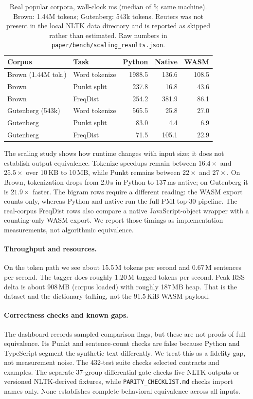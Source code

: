 \documentclass[pdflatex,sn-mathphys-num]{sn-jnl}
\theoremstyle{thmstyleone}
\begin{document}
\begin{table}[!htbp]
\centering
\caption{Real popular corpora, wall-clock ms (median of 5; same machine). Brown: 1.44M tokens; Gutenberg: 543k tokens. Reuters was not present in the local NLTK data directory and is reported as skipped rather than estimated. Raw numbers in \texttt{paper/bench/scaling\_results.json}.}
\label{tab:realcorpora}
\begin{tabular}{@{}l l r r r@{}}
\toprule
Corpus & Task & Python & Native & WASM \\
\midrule
Brown (1.44M tok.) & Word tokenize & 1988.5 & 136.6 & 108.5 \\
Brown              & Punkt split   & 237.8  & 16.8  & 43.6 \\
Brown              & FreqDist      & 254.2  & 381.9 & 86.1 \\
Gutenberg (543k)   & Word tokenize & 565.5  & 25.8  & 27.0 \\
Gutenberg          & Punkt split   & 83.0   & 4.4   & 6.9 \\
Gutenberg          & FreqDist      & 71.5   & 105.1 & 22.9 \\
\bottomrule
\end{tabular}
\end{table}

The scaling study shows how runtime changes with input size; it does not establish output equivalence. Tokenize speedups remain between $16.4\times$ and $25.5\times$ over 10\,KB to 10\,MB, while Punkt remains between $22\times$ and $27\times$. On Brown, tokenization drops from 2.0\,s in Python to 137\,ms native; on Gutenberg it is $21.9\times$ faster. The bigram rows require a different reading: the WASM export counts only, whereas Python and native run the full PMI top-30 pipeline. The real-corpus FreqDist rows also compare a native JavaScript-object wrapper with a counting-only WASM export. We report those timings as implementation measurements, not algorithmic equivalence.

\paragraph{Throughput and resources.}
On the token path we see about 15.5\,M tokens per second and 0.67\,M sentences per second. The tagger does roughly 1.20\,M tagged tokens per second. Peak RSS delta is about 908\,MB (corpus loaded) with roughly 187\,MB heap. That is the dataset and the dictionary talking, not the 91.5\,KiB WASM payload.

\paragraph{Correctness checks and known gaps.}
The dashboard records sampled comparison flags, but these are not proofs of full equivalence. Its Punkt and sentence-count checks are false because Python and TypeScript segment the synthetic text differently. We treat this as a fidelity gap, not measurement noise. The 432-test suite checks selected contracts and examples. The separate 37-group differential gate checks live NLTK outputs or versioned NLTK-derived fixtures, while \texttt{PARITY\_CHECKLIST.md} checks import names only. None establishes complete behavioral equivalence across all inputs.
\end{document}

